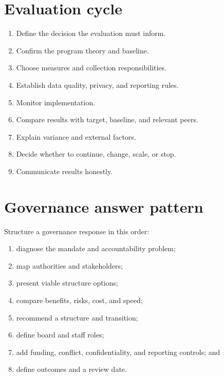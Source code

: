 \documentclass[11pt,letterpaper,oneside,openany]{book}
\begin{document}
\section[Evaluation cycle]{Evaluation cycle}
\begin{enumerate}
\item Define the decision the evaluation must inform.
\item Confirm the program theory and baseline.
\item Choose measures and collection responsibilities.
\item Establish data quality, privacy, and reporting rules.
\item Monitor implementation.
\item Compare results with target, baseline, and relevant peers.
\item Explain variance and external factors.
\item Decide whether to continue, change, scale, or stop.
\item Communicate results honestly.
\end{enumerate}


\section[Governance answer pattern]{Governance answer pattern}
Structure a governance response in this order:


\begin{enumerate}
\item diagnose the mandate and accountability problem;
\item map authorities and stakeholders;
\item present viable structure options;
\item compare benefits, risks, cost, and speed;
\item recommend a structure and transition;
\item define board and staff roles;
\item add funding, conflict, confidentiality, and reporting controls; and
\item define outcomes and a review date.
\end{enumerate}
\end{document}
